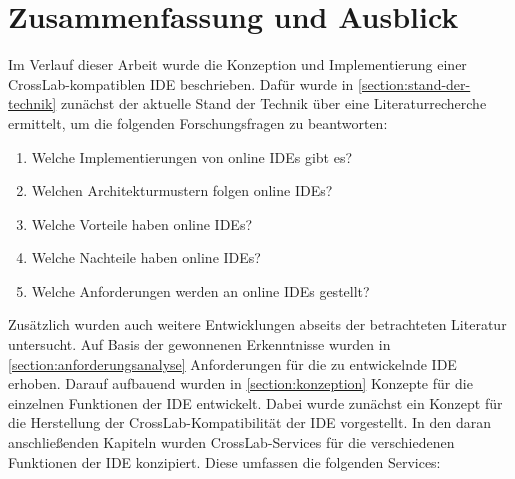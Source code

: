 \chapter{Zusammenfassung und Ausblick}\label{section:zusammenfassung-und-ausblick}


Im Verlauf dieser Arbeit wurde die Konzeption und Implementierung einer CrossLab-kompatiblen IDE beschrieben. Dafür wurde in \autoref{section:stand-der-technik} zunächst der aktuelle Stand der Technik über eine Literaturrecherche ermittelt, um die folgenden Forschungsfragen zu beantworten:

\begin{enumerate}
    \item Welche Implementierungen von online IDEs gibt es?
    \item Welchen Architekturmustern folgen online IDEs?
    \item Welche Vorteile haben online IDEs?
    \item Welche Nachteile haben online IDEs?
    \item Welche Anforderungen werden an online IDEs gestellt?
\end{enumerate}

Zusätzlich wurden auch weitere Entwicklungen abseits der betrachteten Literatur untersucht. Auf Basis der gewonnenen Erkenntnisse wurden in \autoref{section:anforderungsanalyse} Anforderungen für die zu entwickelnde IDE erhoben. Darauf aufbauend wurden in \autoref{section:konzeption} Konzepte für die einzelnen Funktionen der IDE entwickelt. Dabei wurde zunächst ein Konzept für die Herstellung der CrossLab-Kompatibilität der IDE vorgestellt. In den daran anschließenden Kapiteln wurden CrossLab-Services für die verschiedenen Funktionen der IDE konzipiert. Diese umfassen die folgenden Services:

